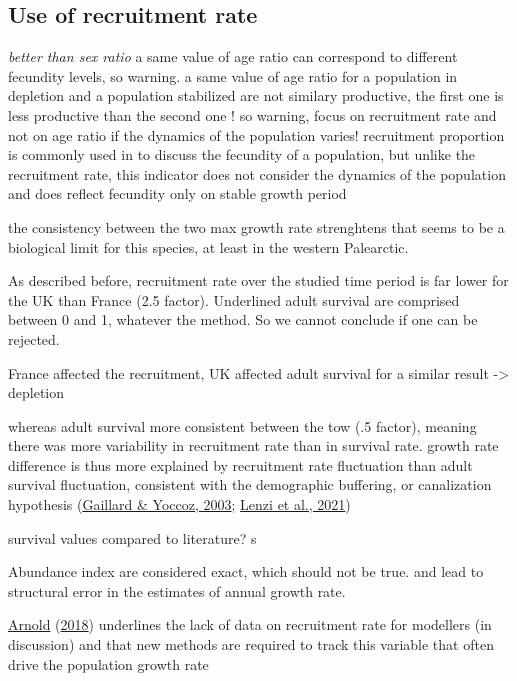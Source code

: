 \documentclass[
  english,
]{article}
\begin{document}
\hypertarget{use-of-recruitment-rate}{%
\subsection{Use of recruitment rate}\label{use-of-recruitment-rate}}

\emph{better than sex ratio}
a same value of age ratio can correspond to different fecundity levels, so warning.
a same value of age ratio for a population in depletion and a population stabilized are not similary productive, the first one is less productive than the second one !
so warning, focus on recruitment rate and not on age ratio if the dynamics of the population varies! recruitment proportion is commonly used in to discuss the fecundity of a population, but unlike the recruitment rate, this indicator does not consider the dynamics of the population and does reflect fecundity only on stable growth period

the consistency between the two max growth rate strenghtens that seems to be a biological limit for this species, at least in the western Palearctic.

As described before, recruitment rate over the studied time period is far lower for the UK than France (2.5 factor).
Underlined adult survival are comprised between 0 and 1, whatever the method. So we cannot conclude if one can be rejected.

France affected the recruitment, UK affected adult survival for a similar result -\textgreater{} depletion

whereas adult survival more consistent between the tow (.5 factor), meaning there was more variability in recruitment rate than in survival rate. growth rate difference is thus more explained by recruitment rate fluctuation than adult survival fluctuation, consistent with the demographic buffering, or canalization hypothesis (\protect\hyperlink{ref-Gaillard2003}{Gaillard \& Yoccoz, 2003}; \protect\hyperlink{ref-Lenzi2021}{Lenzi et al., 2021})

survival values compared to literature? s

Abundance index are considered exact, which should not be true. and lead to structural error in the estimates of annual growth rate.

\protect\hyperlink{ref-Arnold2018}{Arnold} (\protect\hyperlink{ref-Arnold2018}{2018}) underlines the lack of data on recruitment rate for modellers (in discussion) and that new methods are required to track this variable that often drive the population growth rate
\end{document}
